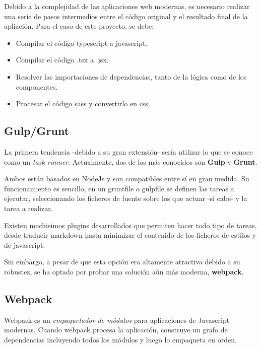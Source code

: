 Debido a la complejidad de las aplicaciones web modernas, es necesario 
realizar una serie de pasos intermedios entre el código original y 
el resultado final de la apliación. Para el caso de este proyecto, se debe:

\begin{itemize}

\item Compilar el código typescript a javascript.

\item Compilar el código .tsx a .jsx.

\item Resolver las importaciones de dependencias, tanto de la lógica
como de los componentes.

\item Procesar el código sass y convertirlo en css.

\end{itemize}

\subsection{Gulp/Grunt}

La primera tendencia -debido a su gran extensión- sería utilizar 
lo que se conoce como un \textit{task runner}. Actualmente, dos de los 
más conocidos son \textbf{Gulp} y \textbf{Grunt}.

\bigskip
Ambos están basados en NodeJs y son compatibles entre sí en gran medida.
Su funcionamiento es sencillo, en un gruntfile o gulpfile se definen las tareas a
ejecutar, seleccionando los ficheros de fuente sobre los que actuar -si cabe- y la tarea 
a realizar.

\bigskip
Existen muchisimos plugins desarrollados que permiten hacer todo tipo de tareas, desde traducir
markdown hasta minimizar el contenido de los ficheros de estilos y de javascript.

\bigskip
Sin embargo, a pesar de que esta opción era altamente atractiva debido 
a su robustez, se ha optado por probar una solución aún más moderna, \textbf{webpack}.

\subsection{Webpack}

Webpack es un \textit{empaquetador de módulos} para aplicaciones de Javascript modernas.
Cuando webpack procesa la aplicación, construye un grafo de dependencias
incluyendo todos los módulos y luego lo empaqueta en orden. 

